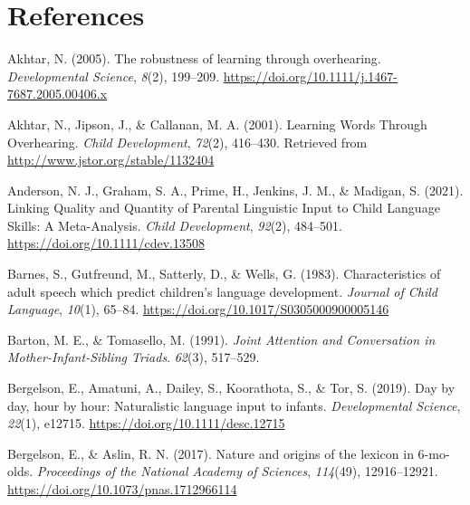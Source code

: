 \documentclass[
  man,floatsintext]{apa6}
\newlength{\cslhangindent}
\newlength{\cslentryspacingunit} %
\newenvironment{CSLReferences}[2] %
 {%
  \setlength{\parindent}{0pt}
  \ifodd #1
  \let\oldpar\par
  \def\par{\hangindent=\cslhangindent\oldpar}
  \fi
  \setlength{\parskip}{#2\cslentryspacingunit}
 }%
 {}
\begin{document}
\newpage

\hypertarget{references}{%
\section{References}\label{references}}

\begingroup
\setlength{\parindent}{-0.5in}
\setlength{\leftskip}{0.5in}

\hypertarget{refs}{}
\begin{CSLReferences}{1}{0}
\leavevmode{}%
Akhtar, N. (2005). The robustness of learning through overhearing. \emph{Developmental Science}, \emph{8}(2), 199--209. \url{https://doi.org/10.1111/j.1467-7687.2005.00406.x}

\leavevmode{}%
Akhtar, N., Jipson, J., \& Callanan, M. A. (2001). Learning {Words} {Through} {Overhearing}. \emph{Child Development}, \emph{72}(2), 416--430. Retrieved from \url{http://www.jstor.org/stable/1132404}

\leavevmode{}%
Anderson, N. J., Graham, S. A., Prime, H., Jenkins, J. M., \& Madigan, S. (2021). Linking {Quality} and {Quantity} of {Parental} {Linguistic} {Input} to {Child} {Language} {Skills}: {A} {Meta}-{Analysis}. \emph{Child Development}, \emph{92}(2), 484--501. \url{https://doi.org/10.1111/cdev.13508}

\leavevmode{}%
Barnes, S., Gutfreund, M., Satterly, D., \& Wells, G. (1983). Characteristics of adult speech which predict children's language development. \emph{Journal of Child Language}, \emph{10}(1), 65--84. \url{https://doi.org/10.1017/S0305000900005146}

\leavevmode{}%
Barton, M. E., \& Tomasello, M. (1991). \emph{Joint {Attention} and {Conversation} in {Mother}-{Infant}-{Sibling} {Triads}}. \emph{62}(3), 517--529.

\leavevmode{}%
Bergelson, E., Amatuni, A., Dailey, S., Koorathota, S., \& Tor, S. (2019). Day by day, hour by hour: {Naturalistic} language input to infants. \emph{Developmental Science}, \emph{22}(1), e12715. \url{https://doi.org/10.1111/desc.12715}

\leavevmode{}%
Bergelson, E., \& Aslin, R. N. (2017). Nature and origins of the lexicon in 6-mo-olds. \emph{Proceedings of the National Academy of Sciences}, \emph{114}(49), 12916--12921. \url{https://doi.org/10.1073/pnas.1712966114}


\end{CSLReferences}
\end{document}
